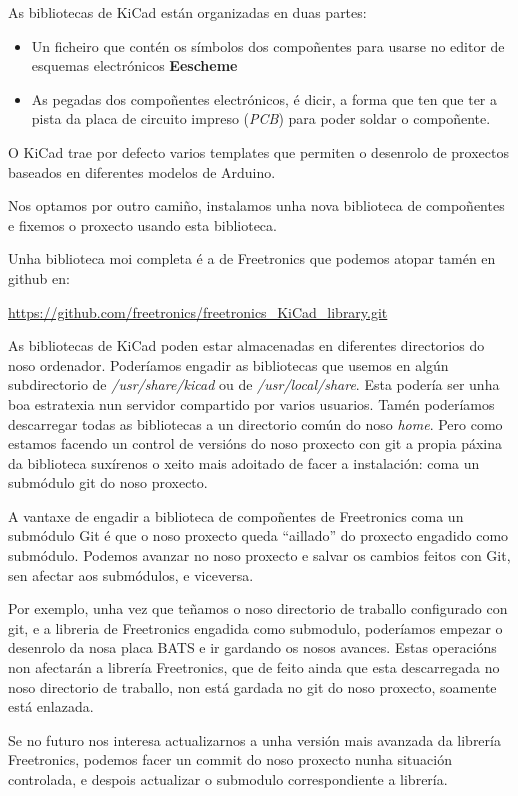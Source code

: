 \documentclass[12pt,galician,]{article}
\begin{document}
As bibliotecas de KiCad están organizadas en duas partes:

\begin{itemize}
\item
  Un ficheiro que contén os símbolos dos compoñentes para usarse no
  editor de esquemas electrónicos \textbf{Eescheme}
\item
  As pegadas dos compoñentes electrónicos, é dicir, a forma que ten que
  ter a pista da placa de circuito impreso (\emph{PCB}) para poder
  soldar o compoñente.
\end{itemize}

O KiCad trae por defecto varios templates que permiten o desenrolo de
proxectos baseados en diferentes modelos de Arduino.

Nos optamos por outro camiño, instalamos unha nova biblioteca de
compoñentes e fixemos o proxecto usando esta biblioteca.

Unha biblioteca moi completa é a de Freetronics que podemos atopar tamén
en github en:

\url{https://github.com/freetronics/freetronics_KiCad_library.git}

As bibliotecas de KiCad poden estar almacenadas en diferentes
directorios do noso ordenador. Poderíamos engadir as bibliotecas que
usemos en algún subdirectorio de \emph{/usr/share/kicad} ou de
\emph{/usr/local/share}. Esta podería ser unha boa estratexia nun
servidor compartido por varios usuarios. Tamén poderíamos descarregar
todas as bibliotecas a un directorio común do noso \emph{home}. Pero
como estamos facendo un control de versións do noso proxecto con git a
propia páxina da biblioteca suxírenos o xeito mais adoitado de facer a
instalación: coma un submódulo git do noso proxecto.

A vantaxe de engadir a biblioteca de compoñentes de Freetronics coma un
submódulo Git é que o noso proxecto queda ``aillado'' do proxecto
engadido como submódulo. Podemos avanzar no noso proxecto e salvar os
cambios feitos con Git, sen afectar aos submódulos, e viceversa.

Por exemplo, unha vez que teñamos o noso directorio de traballo
configurado con git, e a libreria de Freetronics engadida como
submodulo, poderíamos empezar o desenrolo da nosa placa BATS e ir
gardando os nosos avances. Estas operacións non afectarán a librería
Freetronics, que de feito ainda que esta descarregada no noso directorio
de traballo, non está gardada no git do noso proxecto, soamente está
enlazada.

Se no futuro nos interesa actualizarnos a unha versión mais avanzada da
librería Freetronics, podemos facer un commit do noso proxecto nunha
situación controlada, e despois actualizar o submodulo correspondiente a
librería.
\end{document}
